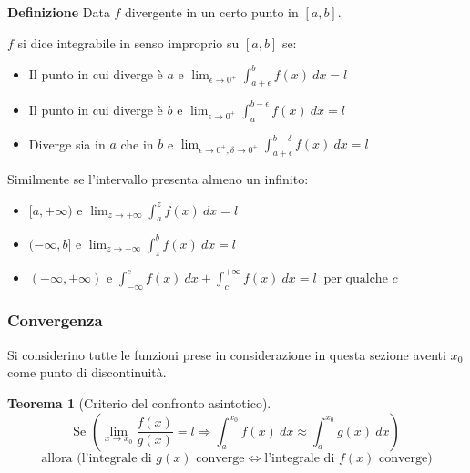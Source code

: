 \documentclass{article}
\newtheorem{theorem}{Teorema}
\begin{document}
\noindent\textbf{Definizione} Data $f$ divergente in un certo punto in $[a,b]$.\newline

$f$ si dice integrabile in senso improprio su $[a,b]$ se:
\begin{itemize}

    \item Il punto in cui diverge è $a$ e $\lim_{\epsilon\rightarrow0^+}\int_{a+\epsilon}^bf(x)\ dx=l$

    \item Il punto in cui diverge è $b$ e $\lim_{\epsilon\rightarrow0^+}\int_a^{b-\epsilon}f(x)\ dx=l$

    \item Diverge sia in $a$ che in $b$ e $\lim_{\epsilon\rightarrow0^+,\delta\rightarrow0^+}\int_{a+\epsilon}^{b-\delta}f(x)\ dx=l$\newline
    
\end{itemize}

\noindent Similmente se l'intervallo presenta almeno un infinito:
\begin{itemize}

    \item $[a,+\infty)$ e $\lim_{z\rightarrow+\infty}\int_{a}^zf(x)\ dx=l$

    \item $(-\infty,b]$ e $\lim_{z\rightarrow-\infty}\int_{z}^bf(x)\ dx=l$

    \item $(-\infty,+\infty)$ e $\int_{-\infty}^cf(x)\ dx+\int_c^{+\infty}f(x)\ dx=l\ \text{ per qualche $c$}$\newline

\end{itemize}

\newpage

\subsubsection{Convergenza}

Si considerino tutte le funzioni prese in considerazione in questa sezione aventi $x_0$ come punto di discontinuità.\newline

\begin{theorem}[Criterio del confronto asintotico]$\ $\newline
    $$\text{Se }\left(\lim_{x\rightarrow x_0}\frac{f(x)}{g(x)}=l\Rightarrow\int_a^{x_0}f(x)\ dx\approx\int_a^{x_0}g(x)\ dx\right)$$
    $$\text{allora\  (l'integrale di } g(x)\text{ converge}\iff\text{l'integrale di } f(x) \text{ converge)}$$\newline
\end{theorem}
\end{document}
